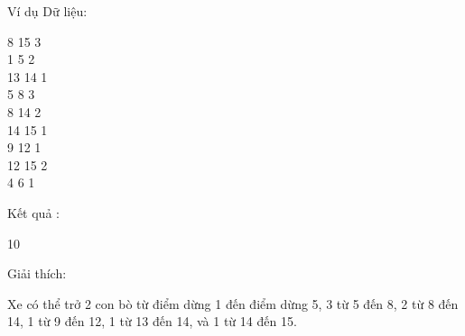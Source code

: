 Ví dụ
Dữ liệu:  

   8 15 3   
\\   1 5 2   
\\   13 14 1   
\\   5 8 3   
\\   8 14 2   
\\   14 15 1   
\\   9 12 1   
\\   12 15 2   
\\   4 6 1  

   Kết quả :  

   10  

   Giải thích:  

   Xe có thể trở 2 con bò từ điểm dừng 1 đến điểm dừng 5, 3 từ 5 đến 8, 2 từ 8 đến 14, 1 từ 9 đến 12, 1 từ 13 đến 14, và 1 từ 14 đến 15.